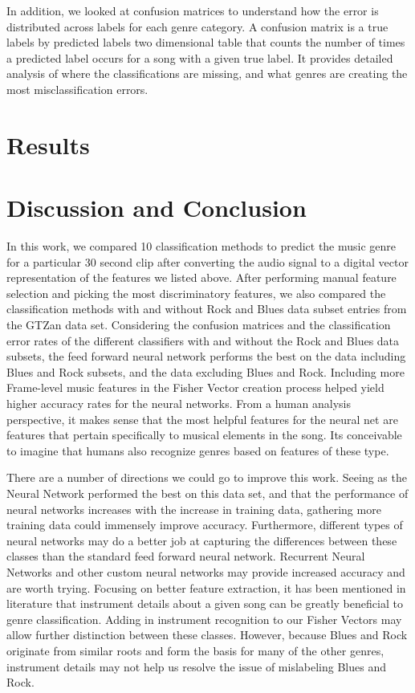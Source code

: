 \documentclass{article}
\begin{document}
\begin{multicols}{2}
In addition, we looked at confusion matrices to understand how the error is distributed across labels for each genre category. A confusion matrix is a true labels by predicted labels two dimensional table that counts the number of times a predicted label occurs for a song with a given true label. It provides detailed analysis of where the classifications are missing, and what genres are creating the most misclassification errors.
\section{Results}

\section{Discussion and Conclusion}
In this work, we compared 10 classification methods to predict the music genre for a particular 30 second clip after converting the audio signal to a digital vector representation of the features we listed above. After performing manual feature selection and picking the most discriminatory features, we also compared the classification methods with and without Rock and Blues data subset entries from the GTZan data set. Considering the confusion matrices and the classification error rates of the different classifiers with and without the Rock and Blues data subsets, the feed forward neural network performs the best on the data including Blues and Rock subsets, and the data excluding Blues and Rock. Including more Frame-level music features in the Fisher Vector creation process helped yield higher accuracy rates for the neural networks. From a human analysis perspective, it makes sense that the most helpful features for the neural net are features that pertain specifically to musical elements in the song. Its conceivable to imagine that humans also recognize genres based on features of these type.

There are a number of directions we could go to improve this work. Seeing as the Neural Network performed the best on this data set, and that the performance of neural networks increases with the increase in training data, gathering more training data could immensely improve accuracy. Furthermore, different types of neural networks may do a better job at capturing the differences between these classes than the standard feed forward neural network. Recurrent Neural Networks and other custom neural networks may provide increased accuracy and are worth trying. Focusing on better feature extraction, it has been mentioned in literature that instrument details about a given song can be greatly beneficial to genre classification. Adding in instrument recognition to our Fisher Vectors may allow further distinction between these classes. However, because Blues and Rock originate from similar roots and form the basis for many of the other genres, instrument details may not help us resolve the issue of mislabeling Blues and Rock.


\end{multicols}
\end{document}
